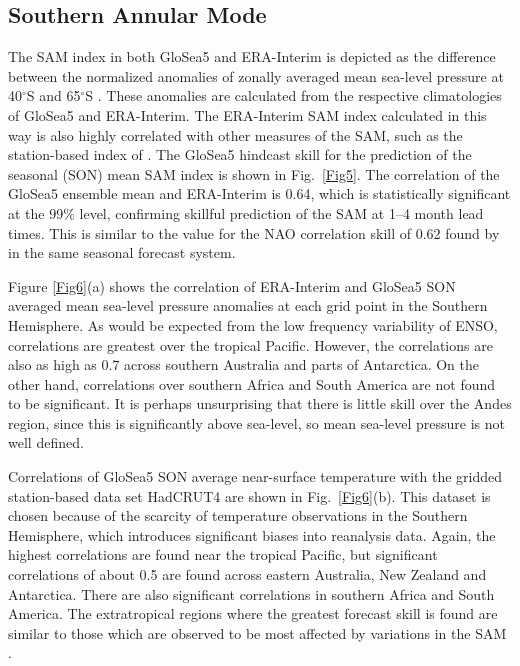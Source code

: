 \subsection{Southern Annular Mode}

The SAM index in both GloSea5 and ERA-Interim is depicted as the difference between the normalized anomalies of zonally averaged mean sea-level pressure at 40$^{\circ}$S and 65$^{\circ}$S \citep{Gong1999}. These anomalies are calculated from the respective climatologies of GloSea5 and ERA-Interim. The ERA-Interim SAM index calculated in this way is also highly correlated with other measures of the SAM, such as the station-based index of \citet{Marshall2003}. The GloSea5 hindcast skill for the prediction of the seasonal (SON) mean SAM index is shown in Fig.\ \ref{Fig5}. The correlation of the GloSea5 ensemble mean and ERA-Interim is 0.64, which is statistically significant at the 99\% level, confirming skillful prediction of the SAM at 1--4 month lead times. This is similar to the value for the NAO correlation skill of 0.62 found by \citet{Scaife2013} in the same seasonal forecast system. 

Figure \ref{Fig6}(a) shows the correlation of ERA-Interim and GloSea5 SON averaged mean sea-level pressure anomalies at each grid point in the Southern Hemisphere. As would be expected from the low frequency variability of ENSO, correlations are greatest over the tropical Pacific. However, the correlations are also as high as 0.7 across southern Australia and parts of Antarctica.  On the other hand, correlations over southern Africa and South America are not found to be significant. It is perhaps unsurprising that there is little skill over the Andes region, since this is significantly above sea-level, so mean sea-level pressure is not well defined.  

Correlations of GloSea5 SON average near-surface temperature with the gridded station-based data set HadCRUT4 \citep{Morice2012} are shown in Fig.\ \ref{Fig6}(b). This dataset is chosen because of the scarcity of temperature observations in the Southern Hemisphere, which introduces significant biases into reanalysis data. Again, the highest correlations are found near the tropical Pacific, but significant correlations of about 0.5 are found across eastern Australia, New Zealand and Antarctica. There are also significant correlations in southern Africa and South America. The extratropical regions where the greatest forecast skill is found are similar to those which are observed to be most affected by variations in the SAM \citep{Gillett2006}.


